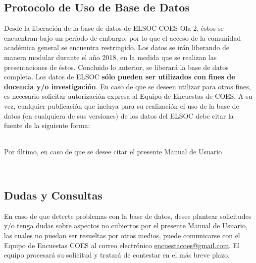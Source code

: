 \documentclass[12pt]{report}
\begin{document}
\newpage
\subsection*{Protocolo de Uso de Base de Datos}

Desde la liberación de la base de datos de ELSOC COES Ola 2, éstos se encuentran bajo un período de embargo, por lo que el acceso de la comunidad académica general se encuentra restringido. Los datos se irán liberando de manera modular durante el año 2018, en la medida que se realizan las presentaciones de éstos. Concluido lo anterior, se liberará la base de datos completa. Los datos de ELSOC \textbf{sólo pueden ser utilizados con fines de docencia y/o investigación}. En caso de que se deseen utilizar para otros fines, es necesario solicitar autorización expresa al Equipo de Encuestas de COES. A su vez, cualquier publicación que incluya para su realización el uso de la base de datos (en cualquiera de sus versiones) de los datos del ELSOC debe citar la fuente de la siguiente forma:\\

\vspace{0.3cm}
\noindent {}\\
\vspace{0.3cm}

Por último, en caso de que se desee citar el presente Manual de Usuario 
\vspace{0.3cm}

\noindent {}\\

\subsection*{Dudas y Consultas}

En caso de que detecte problemas con la base de datos, desee plantear solicitudes y/o tenga dudas sobre aspectos no cubiertos por el presente Manual de Usuario, las cuales no puedan ser resueltas por otros medios, puede comunicarse con el Equipo de Encuestas COES al correo electrónico \href{encuestacoes@gmail.com}{encuestacoes@gmail.com}.
El equipo procesará su solicitud y tratará de contestar en el más breve plazo.\\
\end{document}
